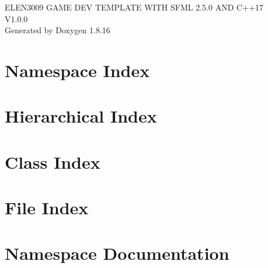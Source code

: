 \let\mypdfximage\pdfximage\def\pdfximage{\immediate\mypdfximage}\documentclass[twoside]{book}
\newcommand{\+}{\discretionary{\mbox{\scriptsize$\hookleftarrow$}}{}{}}
\newcommand{\clearemptydoublepage}{%
  \newpage{\pagestyle{empty}\cleardoublepage}%
}
\begin{document}
\hypersetup{pageanchor=false,
             bookmarksnumbered=true,
             pdfencoding=unicode
            }
\begin{titlepage}
\vspace*{7cm}
\begin{center}%
{\Large E\+L\+E\+N3009 G\+A\+ME D\+EV T\+E\+M\+P\+L\+A\+TE W\+I\+TH S\+F\+ML 2.5.0 A\+ND C++17 \\[1ex]\large V1.\+0.\+0 }\\
\vspace*{1cm}
{\large Generated by Doxygen 1.8.16}\\
\end{center}
\end{titlepage}
\clearemptydoublepage
{}
\tableofcontents
\clearemptydoublepage
{}
\hypersetup{pageanchor=true}

\chapter{Namespace Index}

\chapter{Hierarchical Index}

\chapter{Class Index}

\chapter{File Index}

\chapter{Namespace Documentation}




\end{document}
